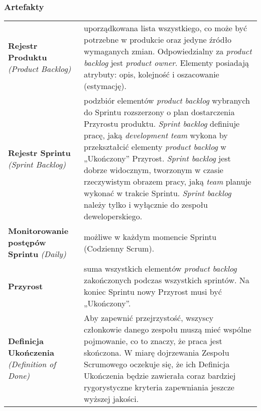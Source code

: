 \documentclass[../main.tex]{subfiles}
\begin{document}
    \subsubsection{Artefakty}
    \begin{table}[H]
        \begin{center}
            \begin{tabular}{ p{} p{} }
                \textbf{Rejestr Produktu} \textit{(Product Backlog)}
                &
                uporządkowana lista wszystkiego,
                co może być potrzebne w produkcie oraz jedyne źródło wymaganych zmian.
                Odpowiedzialny za \textit{product backlog} jest \textit{product owner}.
                Elementy posiadają atrybuty: opis, kolejność i oszacowanie (estymację).
                \\

                \cmidrule(r){1-1}\cmidrule(l){2-2}
                \textbf{Rejestr Sprintu} \textit{(Sprint Backlog)}
                &
                podzbiór elementów \textit{product backlog} wybranych do Sprintu rozszerzony o plan
                dostarczenia Przyrostu produktu.
                \textit{Sprint backlog} definiuje pracę, jaką \textit{development team} wykona by przekształcić elementy
                \textit{product backlog} w „Ukończony” Przyrost.
                \textit{Sprint backlog} jest dobrze widocznym, tworzonym w
                czasie rzeczywistym obrazem pracy, jaką \textit{team} planuje wykonać w trakcie Sprintu.
                \textit{Sprint backlog} należy tylko i wyłącznie do zespołu deweloperskiego.
                \\

                \cmidrule(r){1-1}\cmidrule(l){2-2}
                \textbf{Monitorowanie postępów Sprintu} \textit{(Daily)}
                &
                możliwe w każdym momencie Sprintu (Codzienny Scrum).
                \\

                \cmidrule(r){1-1}\cmidrule(l){2-2}
                \textbf{Przyrost}
                &
                suma wszystkich elementów \textit{product backlog} zakończonych podczas wszystkich sprintów.
                Na koniec Sprintu nowy Przyrost musi być „Ukończony”.
                \\

                \cmidrule(r){1-1}\cmidrule(l){2-2}
                \textbf{Definicja Ukończenia} \textit{(Definition of Done)}
                &
                Aby zapewnić przejrzystość, wszyscy członkowie danego zespołu muszą mieć wspólne
                pojmowanie, co to znaczy, że praca jest skończona. W miarę dojrzewania Zespołu Scrumowego oczekuje się, że ich Definicja Ukończenia będzie
                zawierała coraz bardziej rygorystyczne kryteria zapewniania jeszcze wyższej jakości.
                \\
            \end{tabular}
        \end{center}
    \end{table}
\end{document}
